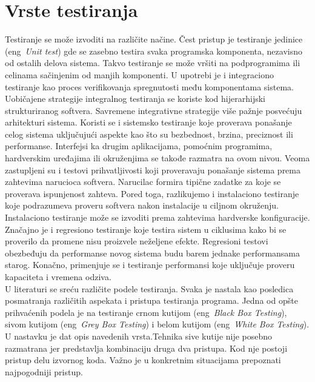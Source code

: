 \documentclass[a4paper]{article}
\begin{document}
{\section{Vrste testiranja}
\label{sec:vrste_testiranja}
Testiranje se može izvoditi na različite načine. Čest pristup je testiranje jedinice (eng~{\em Unit test}) gde se zasebno testira svaka programska 
komponenta, nezavisno od ostalih delova sistema. Takvo testiranje se može vršiti na podprogramima ili celinama sačinjenim od manjih komponenti.
U upotrebi je i integraciono testiranje kao proces verifikovanja spregnutosti među komponentama sistema. Uobičajene strategije integralnog testiranja se koriste kod hijerarhijski strukturiranog softvera. Savremene integrativne strategije više pažnje posvećuju arhitekturi sistema. Koristi se i sistemsko testiranje koje proverava ponašanje celog sistema uključujući aspekte kao što su bezbednost, brzina, preciznost ili performanse. Interfejsi ka drugim aplikacijama, pomoćnim programima, hardverskim uređajima ili okruženjima se takođe razmatra na ovom nivou.
Veoma zastupljeni su i testovi prihvatljivosti koji proveravaju ponašanje sistema prema zahtevima narucioca softvera. Narucilac formira tipične zadatke za koje se proverava ispunjenost zahteva. Pored toga, razlikujemo i instalaciono testiranje koje podrazumeva proveru softvera 
nakon instalacije u ciljnom okruženju. Instalaciono testiranje može se izvoditi prema zahtevima hardverske konfiguracije. Značajno je i regresiono testiranje koje testira sistem u ciklusima kako bi se proverilo da promene
nisu proizvele neželjene efekte. Regresioni testovi obezbeđuju da performanse novog sistema budu barem jednake performansama starog.
Konačno, primenjuje se i testiranje performansi koje uključuje proveru kapaciteta i vremena odziva. \\

U literaturi se sreću različite podele testiranja. Svaka je nastala kao posledica posmatranja različitih aspekata i pristupa testiranja programa. Jedna od opšte prihvaćenih podela je na testiranje crnom kutijom (eng~{\em Black Box Testing}), sivom kutijom (eng~{\em Grey Box Testing}) i belom kutijom (eng~{\em White Box Testing}). U nastavku je dat opis navedenih vrsta.Tehnika sive kutije nije posebno razmatrana jer predstavlja kombinaciju druga dva pristupa. Kod nje postoji pristup delu izvornog koda.
Važno je u konkretnim situacijama prepoznati najpogodniji pristup.

}
\end{document}
